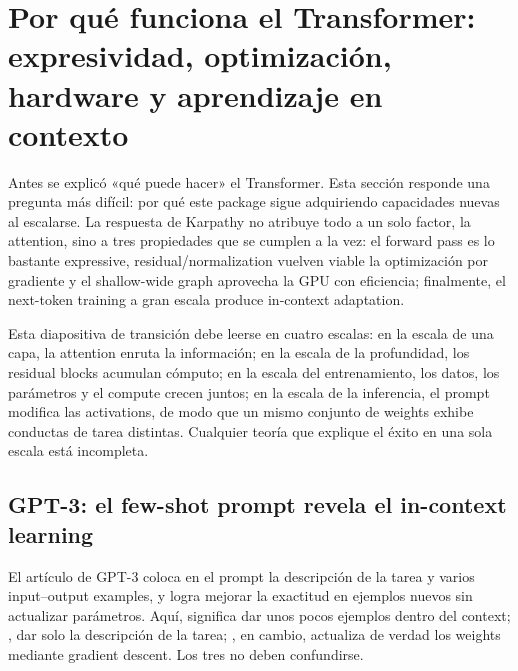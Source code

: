 \section{Por qué funciona el Transformer: expresividad, optimización, hardware y aprendizaje en contexto}

Antes se explicó «qué puede hacer» el Transformer. Esta sección responde una pregunta más difícil: por qué este package sigue adquiriendo capacidades nuevas al escalarse. La respuesta de Karpathy no atribuye todo a un solo factor, la attention, sino a tres propiedades que se cumplen a la vez: el forward pass es lo bastante expressive, residual/normalization vuelven viable la optimización por gradiente y el shallow-wide graph aprovecha la GPU con eficiencia; finalmente, el next-token training a gran escala produce in-context adaptation.


Esta diapositiva de transición debe leerse en cuatro escalas: en la escala de una capa, la attention enruta la información; en la escala de la profundidad, los residual blocks acumulan cómputo; en la escala del entrenamiento, los datos, los parámetros y el compute crecen juntos; en la escala de la inferencia, el prompt modifica las activations, de modo que un mismo conjunto de weights exhibe conductas de tarea distintas. Cualquier teoría que explique el éxito en una sola escala está incompleta.

\subsection{GPT-3: el few-shot prompt revela el in-context learning}

El artículo de GPT-3 coloca en el prompt la descripción de la tarea y varios input--output examples, y logra mejorar la exactitud en ejemplos nuevos sin actualizar parámetros. Aquí,  significa dar unos pocos ejemplos dentro del context; , dar solo la descripción de la tarea; , en cambio, actualiza de verdad los weights mediante gradient descent. Los tres no deben confundirse.


